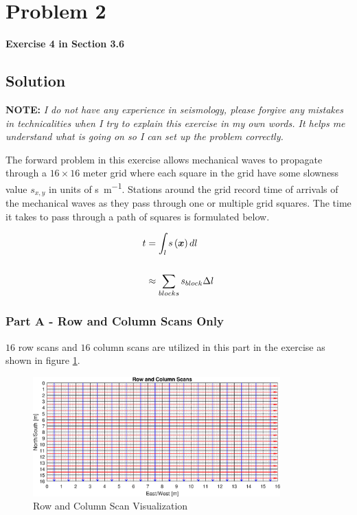 
\begingroup
\allowdisplaybreaks

\newpage
\section{Problem 2}

\textbf{Exercise 4 in Section 3.6}

\subsection{Solution}

\textbf{NOTE: } \textit{I do not have any experience in seismology, please forgive any mistakes in technicalities when I try to explain this exercise in my own words. It helps me understand what is going on so I can set up the problem correctly.}
\newline

The forward problem in this exercise allows mechanical waves to propagate through a $16 \times 16$ meter grid where each square in the grid have some slowness value $s_{x,y}$ in units of \unit{\second\per\meter}. Stations around the grid record time of arrivals of the mechanical waves as they pass through one or multiple grid squares. The time it takes to pass through a path of squares is formulated below.

\begin{align*}
	t &= \int_l s\left(\boldsymbol{x}\right) dl \\
	\\
	&\approx \sum_{blocks} s_{block} \Delta l
\end{align*}


\subsubsection{Part A - Row and Column Scans Only}

$16$ row scans and $16$ column scans are utilized in this part in the exercise as shown in figure \ref{fig: prob2 row column scan viz}. 

\begin{figure}[h] 
	\centering
	\includegraphics[width=0.85\textwidth]{./images/prob2_partA_scans_vizualization.eps}
	\caption{Row and Column Scan Visualization}
	\label{fig: prob2 row column scan viz}
\end{figure}
\FloatBarrier


